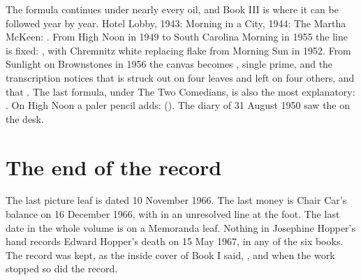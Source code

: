 The formula continues under nearly every oil, and Book III is where it can be followed year by year. Hotel Lobby, 1943:  Morning in a City, 1944:  The Martha McKeen: . From High Noon in 1949 to South Carolina Morning in 1955 the line is fixed: , with Chremnitz white replacing flake from Morning Sun in 1952. From Sunlight on Brownstones in 1956 the canvas becomes , single prime, and the transcription notices that  is struck out on four leaves and left on four others, and that . The last formula, under The Two Comedians, is also the most explanatory: . On High Noon a paler pencil adds:  (). The diary of 31 August 1950 saw the  on the desk.

\section{The end of the record}

The last picture leaf is dated 10 November 1966. The last money is Chair Car's balance on 16 December 1966, with  in an unresolved line at the foot. The last date in the whole volume is  on a Memoranda leaf. Nothing in Josephine Hopper's hand records Edward Hopper's death on 15 May 1967, in any of the six books. The record was kept, as the inside cover of Book I said, , and when the work stopped so did the record.

